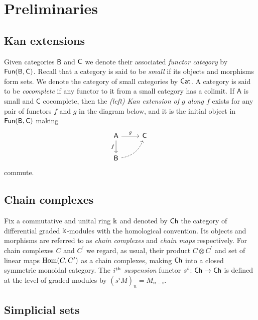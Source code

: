 \section{Preliminaries}
	
	\subsection{Kan extensions}
	
	Given categories $\mathsf{B}$ and $\mathsf{C}$ we denote their associated \textit{functor category} by $\mathsf{Fun}(\mathsf{B}, \mathsf{C})$.
	Recall that a category is said to be \textit{small} if its objects and morphisms form sets.
	We denote the category of small categories by $\mathsf{Cat}$.
	A category is said to be \textit{cocomplete} if any functor to it from a small category has a colimit.
	If $\mathsf{A}$ is small and $\mathsf{C}$ cocomplete, then the \textit{(left) Kan extension of $g$ along $f$} exists for any pair of functors $f$ and $g$ in the diagram below, and it is the initial object in $\mathsf{Fun}(\mathsf{B}, \mathsf{C})$ making
	\begin{equation*}
	\begin{tikzcd}[column sep=normal, row sep=normal]
	\mathsf{A} \arrow[d, "f"'] \arrow[r, "g"] & \mathsf{C} \\ 
	\mathsf{B} \arrow[dashed, ur, bend right] & \quad 
	\end{tikzcd}
	\end{equation*}
	commute.
	
	\subsection{Chain complexes}
	
	Fix a commutative and unital ring $\Bbbk$ and denoted by $\mathsf{Ch}$ the category of differential graded $\Bbbk$-modules with the homological convention.
	Its objects and morphisms are referred to as \textit{chain complexes} and \textit{chain maps} respectively.
	For chain complexes $C$ and $C^\prime$ we regard, as usual, their product $C \otimes C^\prime$ and set of linear maps $\mathrm{Hom}(C, C^\prime)$ as a chain complexes, making $\mathsf{Ch}$ into a closed symmetric monoidal category.
	The $i^\mathrm{th}$ \textit{suspension} functor $s^i \colon \mathsf{Ch} \to \mathsf{Ch}$ is defined at the level of graded modules by $(s^{i}M)_n = M_{n-i}$.
	
	\subsection{Simplicial sets}
	
